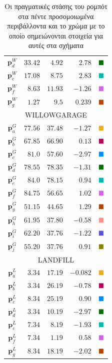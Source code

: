 \begin{table}
\begin{tabular} {c|rrrc}
    $\bm{p}_d^W$   & $33.42$   & $4.92$    & $2.78$          & $\squared$ \\
    $\bm{p}_e^W$   & $17.08$   & $8.75$    & $2.83$          & $\squaree$ \\
    $\bm{p}_f^W$   & $8.63$    & $11.93$   & $-1.26$         & $\squaref$ \\
    $\bm{p}_g^W$   & $1.27$    & $9.5$     & $0.239$         & $\squareg$ \\ \midrule
    \multicolumn{5}{c}{WILLOWGARAGE}                                      \\ \midrule
    $\bm{p}_a^G$   & $77.56$   & $37.48$   & $-1.27$         & $\squarea$ \\
    $\bm{p}_b^G$   & $67.85$   & $66.90$   & $0.13$          & $\squareb$ \\
    $\bm{p}_c^G$   & $81.0$    & $57.60$   & $-2.97$         & $\squarec$ \\
    $\bm{p}_d^G$   & $78.55$   & $78.35$   & $-1.31$         & $\squared$ \\
    $\bm{p}_e^G$   & $84.0$    & $78.15$   & $0.94$          & $\squaree$ \\
    $\bm{p}_f^G$   & $84.75$   & $56.65$   & $1.02$          & $\squaref$ \\
    $\bm{p}_g^G$   & $51.15$   & $44.65$   & $1.29$          & $\squareg$ \\
    $\bm{p}_h^G$   & $61.95$   & $37.80$   & $-0.58$         & $\squareh$ \\
    $\bm{p}_i^G$   & $62.20$   & $37.76$   & $-1.22$         & $\squarei$ \\
    $\bm{p}_j^G$   & $55.20$   & $37.76$   & $0.91$          & $\squarej$ \\ \midrule
    \multicolumn{5}{c}{LANDFILL}                                          \\ \midrule
    $\bm{p}_a^L$   & $3.34$    & $17.19$   & $-0.082$        & $\squarea$ \\
    $\bm{p}_b^L$   & $3.34$    & $26.19$   & $-0.78$         & $\squareb$ \\
    $\bm{p}_c^L$   & $8.34$    & $25.19$   & $0.90$          & $\squarec$ \\
    $\bm{p}_d^L$   & $3.34$    & $10.19$   & $-2.97$         & $\squared$ \\
    $\bm{p}_e^L$   & $7.34$    & $8.19$    & $-1.93$         & $\squaree$ \\
    $\bm{p}_f^L$   & $7.34$    & $1.19$    & $0.58$          & $\squaref$ \\
    $\bm{p}_g^L$   & $8.34$    & $18.19$   & $-2.02$         & $\squareg$ \\ \bottomrule
  \end{tabular}
  \caption{\small Οι πραγματικές στάσης του ρομπότ στα πέντε προσομοιωμένα
           περιβάλλοντα και το χρώμα με το οποίο σημειώνονται στοιχεία για
           αυτές στα σχήματα}
  \label{tbl:02_03_04:true_poses_simulation}
\end{table}




